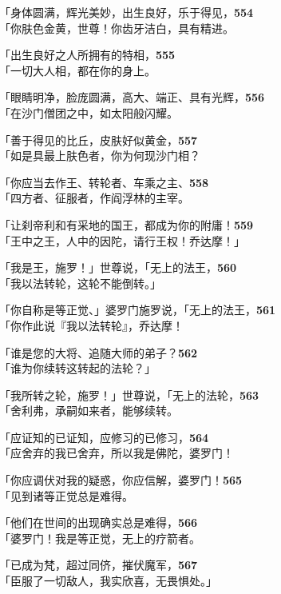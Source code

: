 「身体圆满，辉光美妙，出生良好，乐于得见，\hfill{\grayfootnotesize \textbf{554}} \\
「你肤色金黄，世尊！你齿牙洁白，具有精进。


「出生良好之人所拥有的特相，\hfill{\grayfootnotesize \textbf{555}} \\
「一切大人相，都在你的身上。


「眼睛明净，脸庞圆满，高大、端正、具有光辉，\hfill{\grayfootnotesize \textbf{556}} \\
「在沙门僧团之中，如太阳般闪耀。


「善于得见的比丘，皮肤好似黄金，\hfill{\grayfootnotesize \textbf{557}} \\
「如是具最上肤色者，你为何现沙门相？

「你应当去作王、转轮者、车乘之主、\hfill{\grayfootnotesize \textbf{558}} \\
「四方者、征服者，作阎浮林的主宰。


「让刹帝利和有采地的国王，都成为你的附庸！\hfill{\grayfootnotesize \textbf{559}} \\
「王中之王，人中的因陀，请行王权！乔达摩！」


「我是王，施罗！」世尊说，「无上的法王，\hfill{\grayfootnotesize \textbf{560}} \\
「我以法转轮，这轮不能倒转。」


「你自称是等正觉、」婆罗门施罗说，「无上的法王，\hfill{\grayfootnotesize \textbf{561}} \\
「你作此说『我以法转轮』，乔达摩！

「谁是您的大将、追随大师的弟子？\hfill{\grayfootnotesize \textbf{562}} \\
「谁为你续转这转起的法轮？」


「我所转之轮，施罗！」世尊说，「无上的法轮，\hfill{\grayfootnotesize \textbf{563}} \\
「舍利弗，承嗣如来者，能够续转。


「应证知的已证知，应修习的已修习，\hfill{\grayfootnotesize \textbf{564}} \\
「应舍弃的我已舍弃，所以我是佛陀，婆罗门！


「你应调伏对我的疑惑，你应信解，婆罗门！\hfill{\grayfootnotesize \textbf{565}} \\
「见到诸等正觉总是难得。


「他们在世间的出现确实总是难得，\hfill{\grayfootnotesize \textbf{566}} \\
「婆罗门！我是等正觉，无上的疗箭者。


「已成为梵，超过同侪，摧伏魔军，\hfill{\grayfootnotesize \textbf{567}} \\
「臣服了一切敌人，我实欣喜，无畏惧处。」


